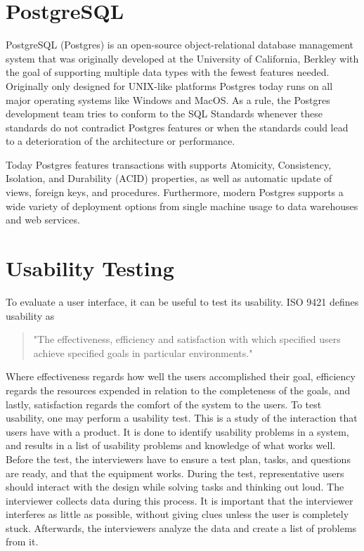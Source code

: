 \section*{PostgreSQL}
PostgreSQL (Postgres) is an open-source object-relational database management system that was originally developed at the University of California, Berkley with the goal of supporting multiple data types with the fewest features needed. Originally only designed for UNIX-like platforms Postgres today runs on all major operating systems like Windows and MacOS\cite{Postgres_Docs}.
As a rule, the Postgres development team tries to conform to the SQL Standards whenever these standards do not contradict Postgres features or when the standards could lead to a deterioration of the architecture or performance\cite{Postgres_Docs}.

Today Postgres features transactions with supports Atomicity, Consistency, Isolation, and Durability (ACID) properties, as well as automatic update of views, foreign keys, and procedures.
Furthermore, modern Postgres supports a wide variety of deployment options from single machine usage to data warehouses and web services\cite{Postgres_Docs}.

\section*{Usability Testing}
To evaluate a user interface, it can be useful to test its usability. ISO 9421 defines usability as
\begin{quote}
	"The effectiveness, efficiency and satisfaction with which specified users achieve specified goals in particular environments."
\end{quote}

Where effectiveness regards how well the users accomplished their goal, efficiency regards the resources expended in relation to the completeness of the goals, and lastly, satisfaction regards the comfort of the system to the users.
To test usability, one may perform a usability test. This is a study of the interaction that users have with a product. It is done to identify usability problems in a system, and results in a list of usability problems and knowledge of what works well.
Before the test, the interviewers have to ensure a test plan, tasks, and questions are ready, and that the equipment works.
During the test, representative users should interact with the design while solving tasks and thinking out loud. The interviewer collects data during this process. It is important that the interviewer interferes as little as possible, without giving clues unless the user is completely stuck.
Afterwards, the interviewers analyze the data and create a list of problems from it.
\cite{deb7}

